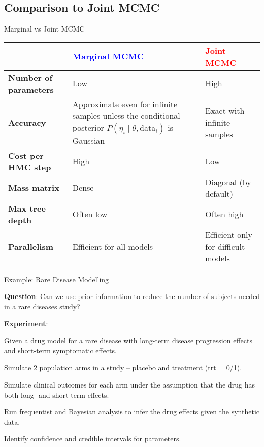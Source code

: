 \subsection{Comparison to Joint MCMC}
\begin{frame}{Marginal vs Joint MCMC}
	\centering
	\small
	\begin{tabular}{|l|p{}|p{}|}
		\toprule
        & \textcolor{blue}{\textbf{Marginal MCMC}} & \textcolor{red}{\textbf{Joint MCMC}} \\ \midrule
		\textbf{Number of parameters} & Low & High \\ \midrule
		\textbf{Accuracy} & Approximate even for infinite samples unless the conditional posterior $P(\eta_i \mid \theta, \text{data}_i)$ is Gaussian & Exact with infinite samples \\ \midrule
		\textbf{Cost per HMC step} & High & Low \\ \midrule
		\textbf{Mass matrix} & Dense & Diagonal (by default) \\ \midrule
		\textbf{Max tree depth} & Often low & Often high \\ \midrule
		\textbf{Parallelism} & Efficient for all models & Efficient only for difficult models \\
		\bottomrule
	\end{tabular}
\end{frame}

\begin{frame}{Example: Rare Disease Modelling}
	\begin{vfilleditems}
		\item \textbf{Question}: Can we use prior information to reduce the number of subjects needed in a rare diseases study?
		\item \textbf{Experiment}:
			\begin{vfilleditems}
				\item Given a drug model for a rare disease with long-term disease progression effects and short-term symptomatic effects.
				\item Simulate 2 population arms in a study – placebo and treatment (trt = 0/1).
				\item Simulate clinical outcomes for each arm under the assumption that the drug has both long- and short-term effects.
				\item Run frequentist and Bayesian analysis to infer the drug effects given the synthetic data.
				\item Identify confidence and credible intervals for parameters.
			\end{vfilleditems}
	\end{vfilleditems}
\end{frame}

